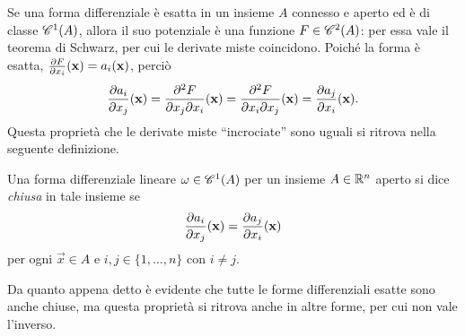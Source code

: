 Se una forma differenziale è esatta in un insieme $A$ connesso e aperto ed è di classe $\cont[1]{A}$, allora il suo potenziale è una funzione $F\in\cont[2]{A}$: per essa vale il teorema di Schwarz, per cui le derivate miste coincidono.
Poiché la forma è esatta, $\drp{F}{x_i}(\vec x)=a_i(\vec x)$, perciò
\begin{equation}
	\drp{a_i}{x_j}(\vec x)=\frac{\partial^2 F}{\partial x_j\partial x_i}(\vec x)=\frac{\partial^2 F}{\partial x_i\partial x_j}(\vec x)=\drp{a_j}{x_i}(\vec x).
\end{equation}
Questa proprietà che le derivate miste ``incrociate'' sono uguali si ritrova nella seguente definizione.
\begin{definizione} \label{d:forma-diff-chiusa}
	Una forma differenziale lineare $\omega\in\cont[1]{A}$ per un insieme $A\in\R^n$ aperto si dice \emph{chiusa} in tale insieme se
	\begin{equation}
		\drp{a_i}{x_j}(\vec x)=\drp{a_j}{x_i}(\vec x)
	\end{equation}
	per ogni $\vec x\in A$ e $i,j\in\{1,\dots,n\}$ con $i\neq j$.
\end{definizione}
Da quanto appena detto è evidente che tutte le forme differenziali esatte sono anche chiuse, ma questa proprietà si ritrova anche in altre forme, per cui non vale l'inverso.
